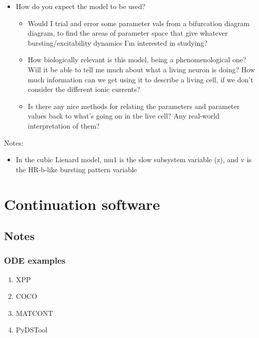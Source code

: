 \documentclass[11pt]{article}
\begin{document}
\begin{itemize}
\item How do you expect the model to be used?
\begin{itemize}
\item Would I trial and error some parameter vals from a bifurcation diagram diagram, to find the areas of parameter space that give whatever bursting/excitability dynamics I'm interested in studying?
\item How biologically relevant is this model, being a phenomenological one? Will it be able to tell me much about what a living neuron is doing? How much information can we get using it to describe a living cell, if we don't consider the different ionic currents?
\item Is there any nice methods for relating the parameters and parameter values back to what's going on in the live cell? Any real-world interpretation of them?
\end{itemize}
\end{itemize}

Notes:
\begin{itemize}
\item In the cubic Lienard model, mu1 is the slow subsystem variable (z), and v is the HR-b-like bursting pattern variable
\end{itemize}

\newpage
\section{Continuation software}
\label{sec:orga68b1c0}
\subsection{Notes}
\label{sec:orgb41ee43}
\subsubsection{ODE examples}
\label{sec:org2311a42}
\begin{enumerate}
\item XPP
\label{sec:org387e062}
\item COCO
\label{sec:orgdec56b3}
\item MATCONT
\label{sec:orgda7eee0}
\item PyDSTool
\label{sec:org1da023a}
\end{enumerate}
\end{document}
